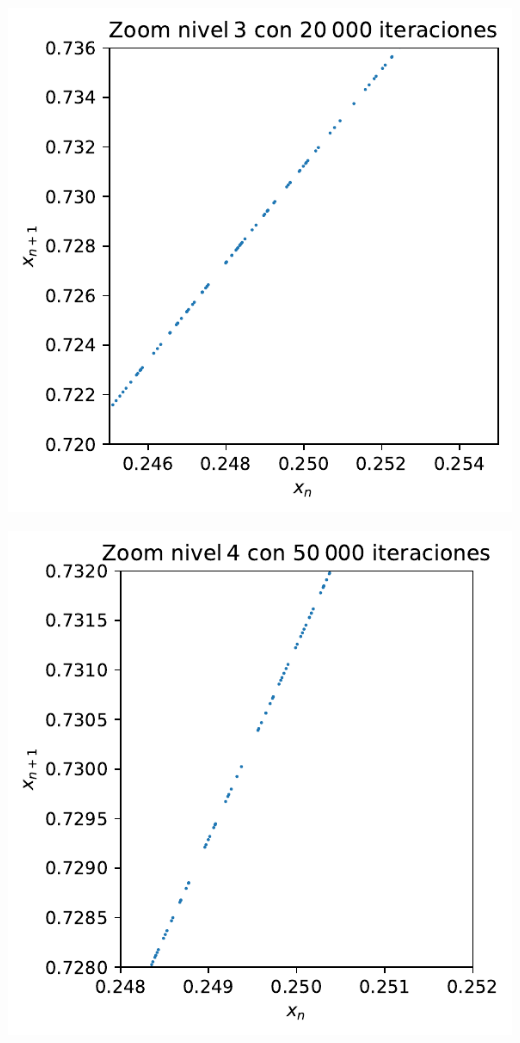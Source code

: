 \documentclass[
  10pt,
  a4paper,
  DIV=11,
  numbers=noendperiod,
  open=any]{scrreprt}
\makeatletter
\newcommand*\pandocbounded[1]{%
  \sbox\pandoc@box{#1}%
  \Gscale@div\@tempa{\textheight}{\dimexpr\ht\pandoc@box+\dp\pandoc@box\relax}%
  \Gscale@div\@tempb{\linewidth}{\wd\pandoc@box}%
  \ifdim\@tempb\p@<\@tempa\p@\let\@tempa\@tempb\fi%
  \ifdim\@tempa\p@<\p@\scalebox{\@tempa}{\usebox\pandoc@box}%
  \else\usebox{\pandoc@box}%
  \fi%
}
\numberwithin{equation}{chapter}
\numberwithin{equation}{section}
\renewcommand{\[}{\begin{equation}}
\renewcommand{\]}{\end{equation}}
\providecommand{\pandocbounded}[1]{#1}%
\renewcommand{\pandocbounded}[1]{\begingroup\centering #1\par\endgroup}
\makeatother
\begin{document}
\pandocbounded{\includegraphics[keepaspectratio]{04-clima/atractor_files/figure-pdf/cell-6-output-4.pdf}}

\pandocbounded{\includegraphics[keepaspectratio]{04-clima/atractor_files/figure-pdf/cell-6-output-5.pdf}}
\end{document}
